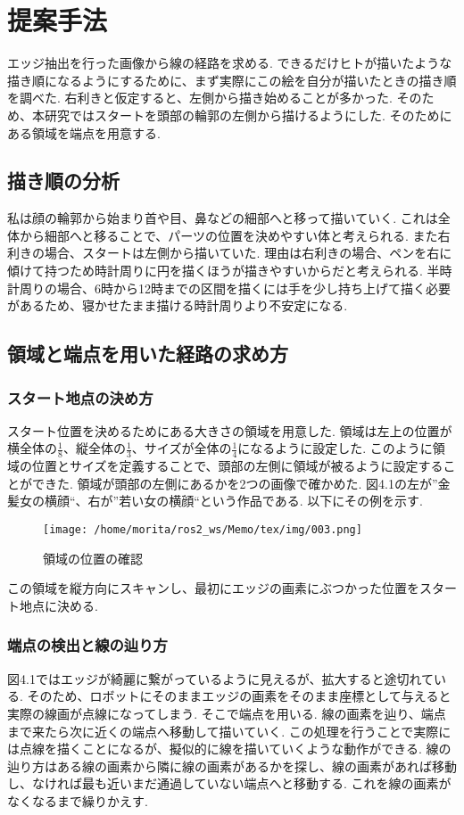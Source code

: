 \chapter{提案手法}
  \label{sec:method}
  エッジ抽出を行った画像から線の経路を求める. できるだけヒトが描いたような描き順になるようにするために、まず実際にこの絵を自分が描いたときの描き順を調べた. 右利きと仮定すると、左側から描き始めることが多かった. そのため、本研究ではスタートを頭部の輪郭の左側から描けるようにした. そのためにある領域を端点を用意する.
  \section{描き順の分析}
  \label{sec:analysis }
  私は顔の輪郭から始まり首や目、鼻などの細部へと移って描いていく. これは全体から細部へと移ることで、パーツの位置を決めやすい体と考えられる. また右利きの場合、スタートは左側から描いていた. 理由は右利きの場合、ペンを右に傾けて持つため時計周りに円を描くほうが描きやすいからだと考えられる. 半時計周りの場合、6時から12時までの区間を描くには手を少し持ち上げて描く必要があるため、寝かせたまま描ける時計周りより不安定になる.
	\section{領域と端点を用いた経路の求め方}
    \label{sec:the way of the route}
	\subsection{スタート地点の決め方}
	\label{sec:how to define the start point}
	スタート位置を決めるためにある大きさの領域を用意した. 領域は左上の位置が横全体の$\frac{1}{8}$、縦全体の$\frac{1}{3}$、サイズが全体の$\frac{1}{4}$になるように設定した. このように領域の位置とサイズを定義することで、頭部の左側に領域が被るように設定することができた. 領域が頭部の左側にあるかを2つの画像で確かめた. 図4.1の左が''金髪女の横顔``、右が''若い女の横顔``という作品である. 以下にその例を示す. 
	  \begin{center}
        \begin{figure}[h]
            \texttt{[image: /home/morita/ros2\_ws/Memo/tex/img/003.png]}
            \caption{領域の位置の確認}
            \label{the position of a region}
        \end{figure}
    \end{center}
	この領域を縦方向にスキャンし、最初にエッジの画素にぶつかった位置をスタート地点に決める.
	\subsection{端点の検出と線の辿り方}
	\label{chap:end points detection}
	図4.1ではエッジが綺麗に繋がっているように見えるが、拡大すると途切れている. そのため、ロボットにそのままエッジの画素をそのまま座標として与えると実際の線画が点線になってしまう. そこで端点を用いる. 線の画素を辿り、端点まで来たら次に近くの端点へ移動して描いていく. この処理を行うことで実際には点線を描くことになるが、擬似的に線を描いていくような動作ができる.
	線の辿り方はある線の画素から隣に線の画素があるかを探し、線の画素があれば移動し、なければ最も近いまだ通過していない端点へと移動する. これを線の画素がなくなるまで繰りかえす.

